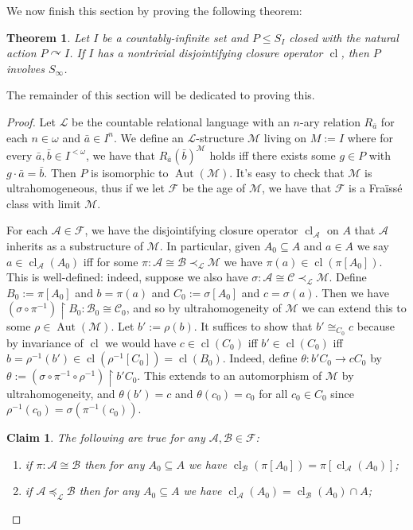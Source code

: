 \documentclass[12pt]{amsart}
\theoremstyle{plain}
\newtheorem{theorem}{Theorem}[section]
\newtheorem{claim}{Claim}
\theoremstyle{definition}
\newcommand{\isom}{\cong}
\newcommand{\mcA}{\mathcal{A}}
\newcommand{\mcB}{\mathcal{B}}
\newcommand{\mcC}{\mathcal{C}}
\newcommand{\mcF}{\mathcal{F}}
\newcommand{\mcL}{\mathcal{L}}
\newcommand{\mcM}{\mathcal{M}}
\DeclareMathOperator{\Aut}{Aut}
\DeclareMathOperator{\cl}{cl}
\begin{document}
We now finish this section by proving the following theorem:

\begin{theorem}\label{thm:disjointifying_closure_implies_involve}
Let $I$ be a countably-infinite set and $P \le S_I$ closed with the natural action $P \curvearrowright I$. If $I$ has a nontrivial disjointifying closure operator $\cl$, then $P$ involves $S_\infty$.
\end{theorem}

The remainder of this section will be dedicated to proving this.

\begin{proof}
Let $\mcL$ be the countable relational language with an $n$-ary relation $R_{\bar{a}}$ for each $n \in \omega$ and $\bar{a} \in I^n$.
We define an $\mcL$-structure $\mcM$ living on $M := I$ where for every $\bar{a}, \bar{b} \in I^{<\omega}$, we have that $R_{\bar{a}}(\bar{b})^{\mcM}$ holds iff there exists some $g \in P$ with $g \cdot \bar{a} = \bar{b}$.
Then $P$ is isomorphic to $\Aut(\mcM)$.
It's easy to check that $\mcM$ is ultrahomogeneous, thus if we let $\mcF$ be the age of $\mcM$, we have that $\mcF$ is a Fra\"{i}ss\'{e} class with limit $\mcM$.

For each $\mcA \in \mcF$, we have the disjointifying closure operator $\cl_{\mcA}$ on $A$ that $\mcA$ inherits as a substructure of $\mcM$.
In particular, given $A_0 \subseteq A$ and $a \in A$ we say $a \in \cl_{\mcA}(A_0)$ iff for some $\pi : \mcA \isom \mcB \prec_\mcL \mcM$ we have $\pi(a) \in \cl(\pi[A_0])$.
This is well-defined: indeed, suppose we also have $\sigma : \mcA \isom \mcC \prec_\mcL \mcM$.
Define $B_0 := \pi[A_0]$ and $b = \pi(a)$ and $C_0 := \sigma[A_0]$ and $c = \sigma(a)$.
Then we have $(\sigma \circ \pi^{-1}) \upharpoonright B_0 : \mcB_0 \isom \mcC_0$, and so by ultrahomogeneity of $\mcM$ we can extend this to some $\rho \in \Aut(\mcM)$.
Let $b' := \rho(b)$.
It suffices to show that $b' \isom_{C_0} c$ because by invariance of $\cl$ we would have $c \in \cl(C_0)$ iff $b' \in \cl(C_0)$ iff $b = \rho^{-1}(b') \in \cl(\rho^{-1}[C_0]) = \cl(B_0)$.
Indeed, define $\theta : b'C_0 \rightarrow cC_0$ by $\theta := (\sigma \circ \pi^{-1} \circ \rho^{-1}) \upharpoonright b'C_0$.
This extends to an automorphism of $\mcM$ by ultrahomogeneity, and $\theta(b') = c$ and $\theta(c_0) = c_0$ for all $c_0 \in C_0$ since $\rho^{-1}(c_0) = \sigma(\pi^{-1}(c_0))$.

\begin{claim}\label{claim:little_closure}
The following are true for any $\mcA, \mcB \in \mcF$:
\begin{enumerate}
\item if $\pi : \mcA \isom \mcB$ then for any $A_0 \subseteq A$ we have $\cl_{\mcB}(\pi[A_0]) = \pi[\cl_{\mcA}(A_0)]$;
\item if $\mcA \preceq_\mcL \mcB$ then for any $A_0 \subseteq A$ we have $\cl_\mcA(A_0) = \cl_\mcB(A_0) \cap A$;
\end{enumerate}
\end{claim}


\end{proof}
\end{document}
